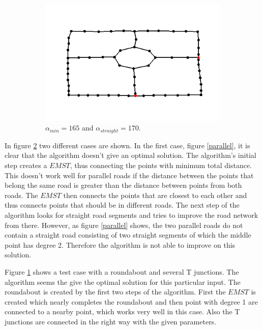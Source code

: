 \documentclass[11pt]{article}
\begin{document}
\begin{figure}[h]
\begin{subfigure}{0.4\linewidth}
  \includegraphics[width=\linewidth]{roundabout167_170}
  \caption{$\alpha_{min}=165$ and $\alpha_{straight}=170$.}
  \label{roundabout}
  \end{subfigure}
  \caption{}
  \label{testcases}
\end{figure}

In figure \ref{testcases} two different cases are shown. In the first case, figure \ref{parallel}, it is clear that the algorithm doesn't give an optimal solution. The algorithm's initial step creates a $EMST$, thus connecting the points with minimum total distance. This doesn't work well for parallel roads if the distance between the points that belong the same road is greater than the distance between points from both roads. The $EMST$ then connects the points that are closest to each other and thus connects points that should be in different roads. The next step of the algorithm looks for straight road segments and tries to improve the road network from there. However, as figure \ref{parallel} shows, the two parallel roads do not contain a straight road consisting of two straight segments of which the middle point has degree 2. Therefore the algorithm is not able to improve on this solution.

Figure \ref{roundabout} shows a test case with a roundabout and several T junctions. The algorithm seems the give the optimal solution for this particular input. The roundabout is created by the first two steps of the algorithm. First the $EMST$ is created which nearly completes the roundabout and then point with degree 1 are connected to a nearby point, which works very well in this case. Also the T junctions are connected in the right way with the given parameters.
\end{document}
